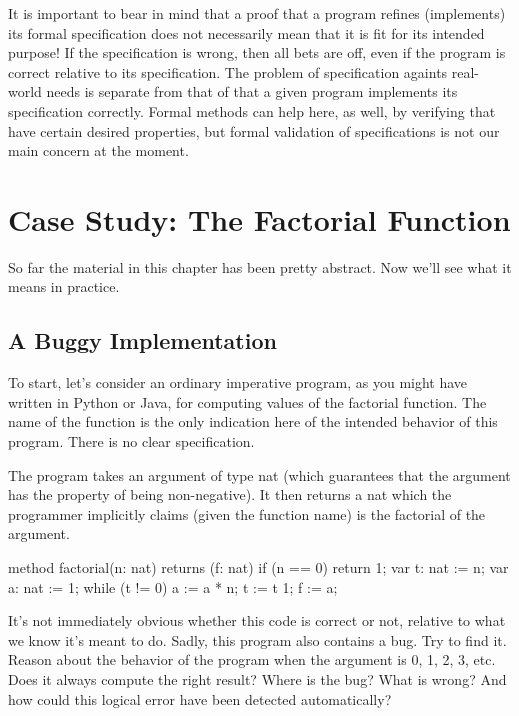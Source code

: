 \documentclass[letterpaper,10pt,english]{sphinxmanual}
\begin{document}
It is important to bear in mind that a proof that a program refines
(implements) its formal specification does not necessarily mean that
it is fit for its intended purpose! If the specification is wrong,
then all bets are off, even if the program is correct relative to its
specification.  The problem of  specification againts
real-world needs is separate from that of  that a given
program implements its specification correctly. Formal methods can
help here, as well, by verifying that  have certain
desired properties, but formal validation of specifications is not
our main concern at the moment.


\section{Case Study: The Factorial Function}
\label{\detokenize{05-verifying-logical-specifications:case-study-the-factorial-function}}
So far the material in this chapter has been pretty abstract. Now
we’ll see what it means in practice.


\subsection{A Buggy Implementation}
\label{\detokenize{05-verifying-logical-specifications:a-buggy-implementation}}
To start, let’s consider an ordinary imperative program, as you might
have written in Python or Java, for computing values of the factorial
function. The name of the function is the only indication here of the
intended behavior of this program. There is no clear specification.

The program takes an argument of type nat (which guarantees that the
argument has the property of being non-negative). It then returns a
nat which the programmer implicitly claims (given the function name)
is the factorial of the argument.

\begin{sphinxVerbatim}[commandchars=\\\{\}]
method factorial(n: nat) returns (f: nat)
\PYGZob{}
    if (n == 0)
    \PYGZob{}
        return 1;
    \PYGZcb{}
    var t: nat := n;
    var a: nat := 1;
    while (t !=  0)
    \PYGZob{}
        a := a * n;
        t := t \PYGZhy{} 1;
    \PYGZcb{}
    f := a;
\PYGZcb{}
\end{sphinxVerbatim}

It’s not immediately obvious whether this code is correct or not,
relative to what we know it’s meant to do. Sadly, this program also
contains a bug. Try to find it. Reason about the behavior of the
program when the argument is 0, 1, 2, 3, etc.  Does it always compute
the right result? Where is the bug? What is wrong? And how could this
logical error have been detected automatically?
\end{document}
